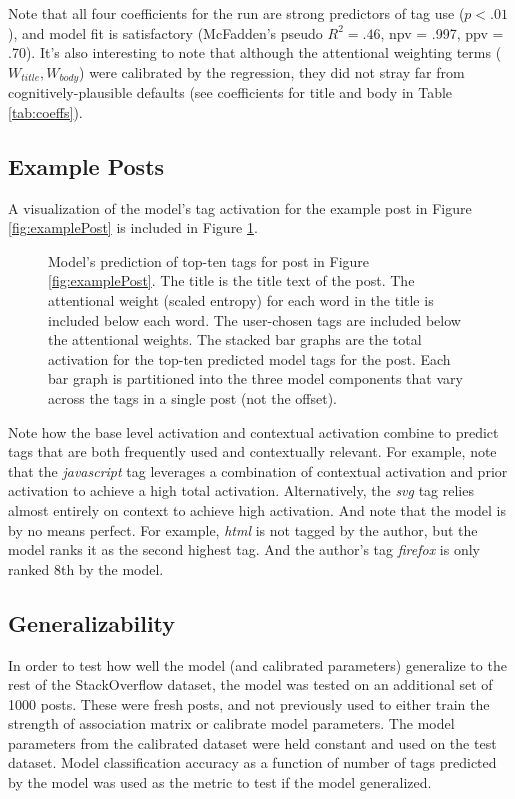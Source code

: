 \documentclass[10pt,letterpaper]{article}
\begin{document}
Note that all four coefficients for the run are strong predictors of tag use ($p<.01$), and model fit is satisfactory (McFadden's pseudo $R_{}^{2}=.46$, npv = .997, ppv = .70).
It's also interesting to note that although the attentional weighting terms ($W_{title}, W_{body}$) were calibrated by the regression, they did not stray far from cognitively-plausible defaults
(see coefficients for title and body in Table \ref{tab:coeffs}).

\subsection{Example Posts}

A visualization of the model's tag activation for the example post in Figure \ref{fig:examplePost} is included in Figure \ref{fig:modelPost}.

\begin{figure}[ht]
  \centering
  \caption{
    Model's prediction of top-ten tags for post in Figure \ref{fig:examplePost}.
    The title is the title text of the post.
    The attentional weight (scaled entropy) for each word in the title is included below each word.
    The user-chosen tags are included below the attentional weights.
    The stacked bar graphs are the total activation for the top-ten predicted model tags for the post.
    Each bar graph is partitioned into the three model components that vary across the tags in a single post (not the offset).
}
  \label{fig:modelPost}
\end{figure}

Note how the base level activation and contextual activation combine to predict tags that are both frequently used and contextually relevant.
For example, note that the \emph{javascript} tag leverages a combination of contextual activation and prior activation to achieve a high total activation.
Alternatively, the \emph{svg} tag relies almost entirely on context to achieve high activation.
And note that the model is by no means perfect.
For example, \emph{html} is not tagged by the author, but the model ranks it as the second highest tag.
And the author's tag \emph{firefox} is only ranked 8th by the model.

\subsection{Generalizability}

In order to test how well the model (and calibrated parameters) generalize to the rest of the StackOverflow dataset, the model was tested on an additional set of \num{1000} posts.
These were fresh posts, and not previously used to either train the strength of association matrix or calibrate model parameters.
The model parameters from the calibrated dataset were held constant and used on the test dataset.
Model classification accuracy as a function of number of tags predicted by the model was used as the metric to test if the model generalized.
\end{document}
